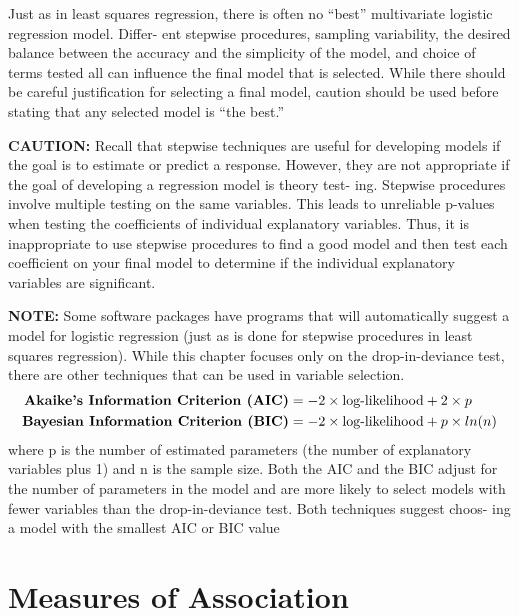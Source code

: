 \documentclass[
]{report}
\begin{document}
Just as in least squares regression, there is often no ``best'' multivariate logistic regression model. Differ-
ent stepwise procedures, sampling variability, the desired balance between the accuracy and the simplicity
of the model, and choice of terms tested all can influence the final model that is selected. While there should
be careful justification for selecting a final model, caution should be used before stating that any selected
model is ``the best.''

\large

\textbf{CAUTION:}
Recall that stepwise techniques are useful for developing models if the goal is to estimate or predict a
response. However, they are not appropriate if the goal of developing a regression model is theory test-
ing. Stepwise procedures involve multiple testing on the same variables. This leads to unreliable p-values
when testing the coefficients of individual explanatory variables. Thus, it is inappropriate to use stepwise
procedures to find a good model and then test each coefficient on your final model to determine if the
individual explanatory variables are significant.
\normalsize 

\large

\textbf{NOTE:}
Some software packages have programs that will automatically suggest a model for logistic regression
(just as is done for stepwise procedures in least squares regression). While this chapter focuses only on
the drop-in-deviance test, there are other techniques that can be used in variable selection.
\begin{align}
\textbf{Akaike’s Information Criterion (AIC)} &= -2 \times \text{log-likelihood} + 2 \times p \notag \\
\textbf{Bayesian Information Criterion (BIC)} &= -2 \times \text{log-likelihood} + p \times ln(n) \notag
\end{align}
where p is the number of estimated parameters (the number of explanatory variables plus 1) and n is the
sample size. Both the AIC and the BIC adjust for the number of parameters in the model and are more
likely to select models with fewer variables than the drop-in-deviance test. Both techniques suggest choos-
ing a model with the smallest AIC or BIC value
\normalsize 

\hypertarget{measures-of-association}{%
\section{\texorpdfstring{\textbf{Measures of Association}}{Measures of Association}}\label{measures-of-association}}
\end{document}
